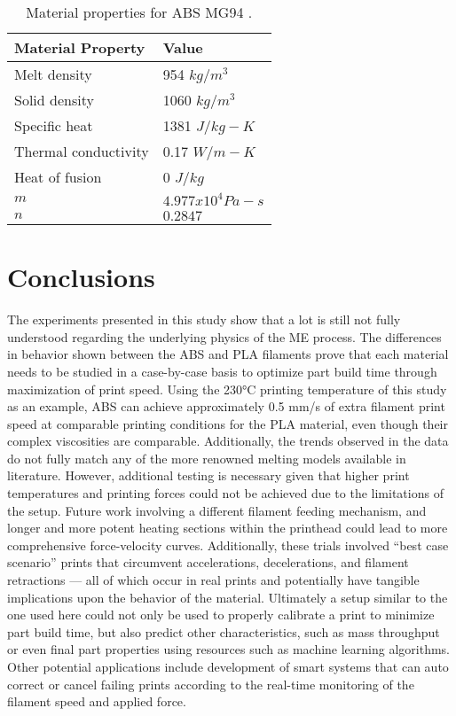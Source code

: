 \documentclass[main.tex]{subfiles}
\begin{document}
\begin{table}[!htbp] 
	\renewcommand{\arraystretch}{1.5}
	\centering
	\caption{Material properties for ABS MG94 \cite{ColonQuintana2020}.}
	\begin{tabular}{C C} 
		\toprule
		\textbf{Material Property} & \textbf{Value}\\
		\midrule
		Melt density & 954 $kg/m^3$\\
		Solid density & 1060 $kg/m^3$\\
		Specific heat & 1381 $J/kg-K$\\
		Thermal conductivity & 0.17 $W/m-K$\\
		Heat of fusion & 0 $J/kg$\\
		\midrule
		$m$ & $4.977x10^{4} Pa - s$\\
		$n$ & $0.2847$\\
		\bottomrule
	\end{tabular}
	\label{tab:mat_prop_models_1}
\end{table}


\pagebreak
\section{Conclusions}

The experiments presented in this study show that a lot is still not fully understood regarding the underlying physics of the ME process. The differences in behavior shown between the ABS and PLA filaments prove that each material needs to be studied in a case-by-case basis to optimize part build time through maximization of print speed. Using the 230°C printing temperature of this study as an example, ABS can achieve approximately 0.5 mm/s of extra filament print speed at comparable printing conditions for the PLA material, even though their complex viscosities are comparable. Additionally, the trends observed in the data do not fully match any of the more renowned melting models available in literature. However, additional testing is necessary given that higher print temperatures and printing forces could not be achieved due to the limitations of the setup. Future work involving a different filament feeding mechanism, and longer and more potent heating sections within the printhead could lead to more comprehensive force-velocity curves. Additionally, these trials involved “best case scenario” prints that circumvent accelerations, decelerations, and filament retractions — all of which occur in real prints and potentially have tangible implications upon the behavior of the material. 
Ultimately a setup similar to the one used here could not only be used to properly calibrate a print to minimize part build time, but also predict other characteristics, such as mass throughput or even final part properties using resources such as machine learning algorithms. Other potential applications include development of smart systems that can auto correct or cancel failing prints according to the real-time monitoring of the filament speed and applied force.

% 
%
%
\end{document}
